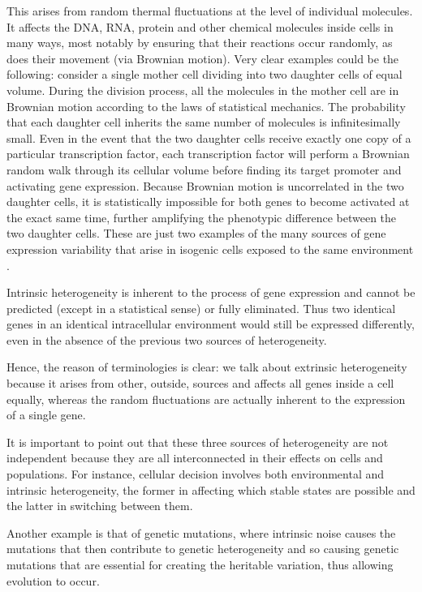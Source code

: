 \documentclass[12pt,a4paper]{report}
\begin{document}
This arises from random thermal fluctuations at the level of individual molecules. It affects the DNA, RNA, protein and other chemical molecules inside cells in many ways, most notably by ensuring that their reactions occur randomly, as does their movement (via Brownian motion). Very clear examples could be the following: consider a single mother cell dividing into two daughter cells of equal volume. During the division process, all the molecules in the mother cell are in Brownian motion according to the laws of statistical mechanics. The probability that each daughter cell inherits the same number of molecules is infinitesimally small. Even in the event that the two daughter cells receive exactly one copy of a particular transcription factor, each transcription factor will perform a Brownian random walk through its cellular volume before finding its target promoter and activating gene expression. Because Brownian motion is uncorrelated in the two daughter cells, it is statistically impossible for both genes to become activated at the exact same time, further amplifying the phenotypic difference between the two daughter cells. These are just two examples of the many sources of gene expression
variability that arise in isogenic cells exposed to the same environment \cite{geneexpressionnoise}.

 Intrinsic heterogeneity is inherent to the process of gene expression and cannot be predicted (except in a statistical sense) or fully eliminated. Thus two identical genes in an identical intracellular environment would still be expressed differently, even in the absence of the previous two sources of heterogeneity.
 
 Hence, the reason of terminologies is clear: we talk about extrinsic heterogeneity because it arises from other, outside, sources and affects all genes inside a cell equally, whereas the random fluctuations are actually inherent to the expression of a single gene.
 
 It is important to point out that these three sources of heterogeneity are not independent because they are all interconnected in their effects on cells and populations. For instance, cellular decision involves both environmental and intrinsic heterogeneity, the former in affecting which stable states are possible and the latter in switching between them.
 
 Another example is that of genetic mutations, where intrinsic noise causes the mutations that then contribute to genetic heterogeneity and so causing genetic mutations that are essential for creating the heritable variation, thus allowing evolution to occur.
 
\end{document}
